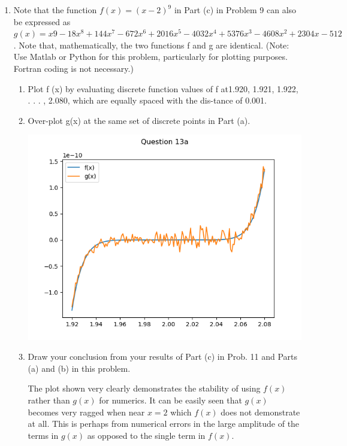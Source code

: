 \documentclass{article}
\begin{document}
\begin{enumerate}
    \item %
    Note that the function $f(x) = (x-2)^9$ in Part (c) in Problem 9 can also be expressed as $g(x) = x9 - 18x^8 + 144x^7 -672x^6 +2016x^5 -4032x^4 +5376x^3 - 4608x^2 + 2304x - 512$. Note that, mathematically, the two functions f and g are identical. (Note: Use Matlab or Python for this problem, particularly for plotting purposes. Fortran coding is not necessary.)
    \begin{enumerate}
    \item 
    Plot f (x) by evaluating discrete function values of f at1.920, 1.921, 1.922, . . . , 2.080, which are equally spaced with the dis-tance of 0.001.
    \item 
    Over-plot g(x) at the same set of discrete points in Part (a).
    \begin{center}
    \includegraphics[width=.5\textwidth]{"../python/question13.png"}
    \end{center}
    \item
    Draw your conclusion from your results of Part (c) in Prob. 11 and Parts (a) and (b) in this problem.

    The plot shown very clearly demonstrates the stability of using $f(x)$ rather than $g(x)$ for numerics. It can be easily seen that $g(x)$ becomes very ragged when near $x = 2$ which $f(x)$ does not demonstrate at all. This is perhaps from numerical errors in the large amplitude of the terms in $g(x)$ as opposed to the single term in $f(x)$. 
   \end{enumerate}
    


\end{enumerate}
\end{document}
